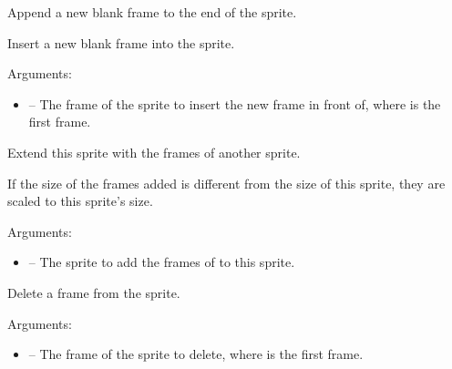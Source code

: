 \documentclass[letterpaper,10pt,english]{sphinxmanual}
\begin{document}

\begin{fulllineitems}
\label{gfx:sge.gfx.Sprite.append_frame}
Append a new blank frame to the end of the sprite.

\end{fulllineitems}


\begin{fulllineitems}
\label{gfx:sge.gfx.Sprite.insert_frame}
Insert a new blank frame into the sprite.

Arguments:
\begin{itemize}
\item {} 
 -- The frame of the sprite to insert the new frame
in front of, where  is the first frame.

\end{itemize}

\end{fulllineitems}


\begin{fulllineitems}
\label{gfx:sge.gfx.Sprite.extend}
Extend this sprite with the frames of another sprite.

If the size of the frames added is different from the size of
this sprite, they are scaled to this sprite's size.

Arguments:
\begin{itemize}
\item {} 
 -- The sprite to add the frames of to this sprite.

\end{itemize}

\end{fulllineitems}


\begin{fulllineitems}
\label{gfx:sge.gfx.Sprite.delete_frame}
Delete a frame from the sprite.

Arguments:
\begin{itemize}
\item {} 
 -- The frame of the sprite to delete, where  is
the first frame.

\end{itemize}

\end{fulllineitems}
\end{document}
